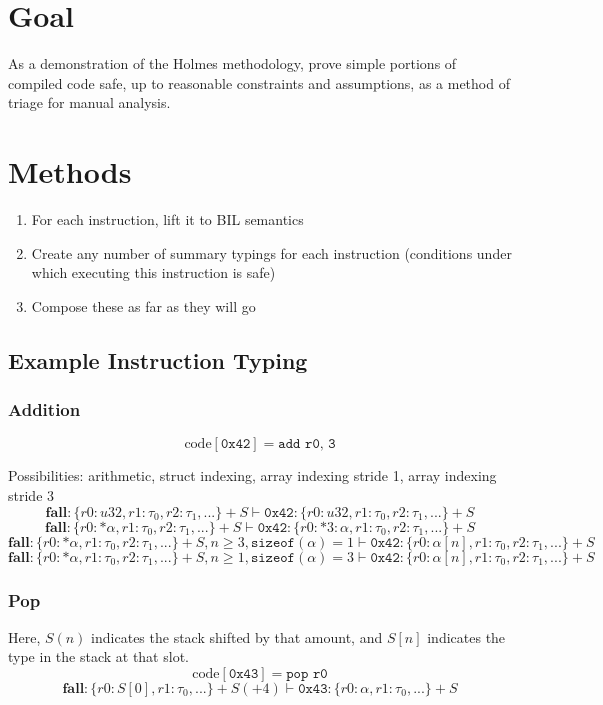 \documentclass{article}
\begin{document}
\section{Goal}
As a demonstration of the Holmes methodology, prove simple portions of compiled code safe, up to reasonable constraints and assumptions, as a method of triage for manual analysis.
\section{Methods}
\begin{enumerate}
\item For each instruction, lift it to BIL semantics
\item Create any number of summary typings for each instruction (conditions under which executing this instruction is safe)
\item Compose these as far as they will go
\end{enumerate}

\subsection{Example Instruction Typing}

\subsubsection{Addition}
\[\mathrm{code} [ \texttt{0x42} ] = \texttt{add r0, 3}\]

Possibilities: arithmetic, struct indexing, array indexing stride 1, array indexing stride 3
\[\mathbf{fall} : \{r0 : u32, r1 : \tau_0, r2 : \tau_1, ... \}+S \vdash \texttt{0x42} : \{r0 : u32, r1 : \tau_0, r2 : \tau_1, ...\}+S\]
\[\mathbf{fall} : \{r0 : *\alpha, r1 : \tau_0, r2 : \tau_1, ... \}+S \vdash \texttt{0x42} : \{r0 : *{3:\alpha}, r1 : \tau_0, r2 : \tau_1, ...\}+S\]
\[\mathbf{fall} : \{r0 : *\alpha, r1 : \tau_0, r2 : \tau_1, ... \}+S, n \geq 3, \texttt{sizeof}(\alpha) = 1 \vdash \texttt{0x42} : \{r0 : \alpha[n], r1 : \tau_0, r2 : \tau_1, ...\}+S\]
\[\mathbf{fall} : \{r0 : *\alpha, r1 : \tau_0, r2 : \tau_1, ... \}+S, n \geq 1, \texttt{sizeof}(\alpha) = 3 \vdash \texttt{0x42} : \{r0 : \alpha[n], r1 : \tau_0, r2 : \tau_1, ...\}+S\]

\subsubsection{Pop}
Here, $S(n)$ indicates the stack shifted by that amount, and $S[n]$ indicates the type in the stack at that slot.
\[\mathrm{code} [ \texttt{0x43} ] = \texttt{pop r0}\]
\[\mathbf{fall} : \{r0 : S[0], r1 : \tau_0, ...\}+S(+4) \vdash \texttt{0x43} : \{r0 : \alpha, r1 : \tau_0, ...\}+S\]
\end{document}
